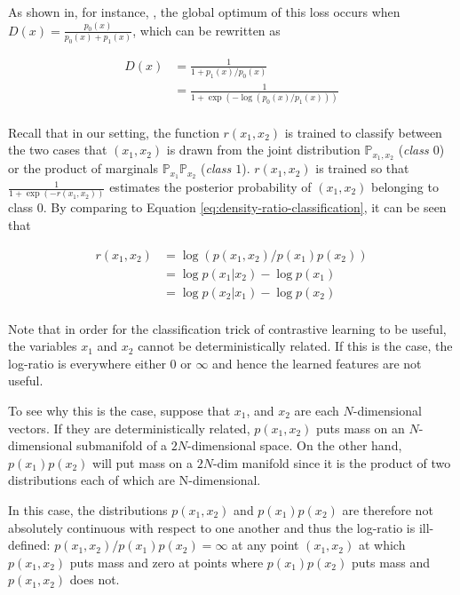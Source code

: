 As shown in, for instance, \cite{goodfellow2014generative}, the global optimum of this loss occurs when $D(x) = \frac{p_0(x)}{p_0(x) + p_1(x)}$, which can be rewritten as

\begin{align}
    D(x) &= \frac{1}{1 + p_1(x)/p_0(x)}\\
    &= \frac{1}{1 + \exp ( - \log (p_0(x)/p_1(x))) } \label{eq:density-ratio-classification}\\
\end{align}

Recall that in our setting, the function $r(x_1, x_2)$ is trained to classify between the two cases that $(x_1, x_2)$ is drawn from the joint distribution $\mathbb{P}_{x_1, x_2}$ (\emph{class $0$}) or the product of marginals $\mathbb{P}_{x_1}\mathbb{P}_{x_2}$ (\emph{class $1$}).
$r(x_1, x_2)$ is trained so that $\frac{1}{1 + \exp(-r(x_1, x_2))}$ estimates the posterior probability of $(x_1, x_2)$ belonging to class 0.
By comparing to Equation \ref{eq:density-ratio-classification}, it can be seen that

\begin{align*}
    r(x_1, x_2) &= \log \left( p(x_1, x_2) / p(x_1) p(x_2)\right) \\
    &= \log p(x_1 | x_2)  - \log p(x_1) \\
    &= \log p(x_2 | x_1)  - \log p(x_2) \\
\end{align*}

Note that in order for the classification trick of contrastive learning to be useful, the variables $x_1$ and $x_2$ cannot be deterministically related.
If this is the case, the log-ratio is everywhere either $0$ or $\infty$ and hence the learned features are not useful.

To see why this is the case, suppose that $x_1$, and $x_2$ are each $N$-dimensional vectors.
If they are deterministically related, $p(x_1, x_2)$ puts mass on an $N$-dimensional submanifold of a $2N$-dimensional space.
On the other hand, $p(x_1)p(x_2)$ will put mass on a $2N$-dim manifold since it is the product of two distributions each of which are N-dimensional.

In this case, the distributions $p(x_1, x_2)$ and $p(x_1)p(x_2)$ are therefore not absolutely continuous with respect to one another and thus the log-ratio is ill-defined: $p(x_1, x_2)/p(x_1)p(x_2) = \infty$ at any point $(x_1,x_2)$ at which $p(x_1, x_2)$ puts mass and zero at points where $p(x_1)p(x_2)$ puts mass and $p(x_1,x_2)$ does not.


